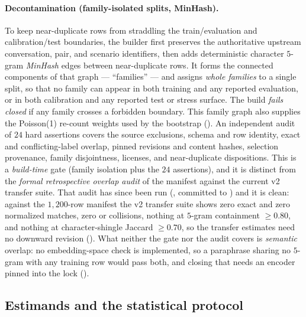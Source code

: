 \paragraph{Decontamination (family-isolated splits, MinHash).} To keep near-duplicate rows from
straddling the train/evaluation and calibration/test boundaries, the builder first preserves the
authoritative upstream conversation, pair, and scenario identifiers, then adds deterministic character
$5$-gram \emph{MinHash} edges between near-duplicate rows. It forms the connected components of that
graph --- ``families'' --- and assigns \emph{whole families} to a single split, so that no family can
appear in both training and any reported evaluation, or in both calibration and any reported test or
stress surface. The build \emph{fails closed} if any family crosses a forbidden boundary. This family
graph also supplies the Poisson(1) re-count weights used by the bootstrap (). An
independent audit of $24$ hard assertions covers the source exclusions, schema and row identity,
exact and conflicting-label overlap, pinned revisions and content hashes, selection provenance, family
disjointness, licenses, and near-duplicate dispositions. This is a \emph{build-time} gate (family isolation
plus the $24$ assertions), and it is distinct from the \emph{formal retrospective overlap audit} of the
manifest against the current v2 transfer suite. That audit has since been run
(, committed to ) and it is
clean: against the $1{,}200$-row manifest the v2 transfer suite shows zero exact and zero normalized
matches, zero  or  collisions, nothing at $5$-gram containment
$\geq0.80$, and nothing at character-shingle Jaccard $\geq0.70$, so the transfer estimates need no
downward revision (). What neither the gate nor the audit covers is
\emph{semantic} overlap: no embedding-space check is implemented, so a paraphrase sharing no $5$-gram with
any training row would pass both, and closing that needs an encoder pinned into the lock
().

\subsection{Estimands and the statistical protocol}
\label{sec:setup-stats}

